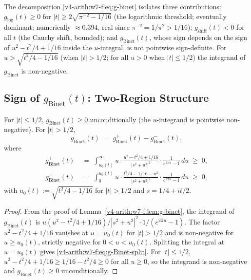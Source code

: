 \begin{remark}
\label{v4-arith:w7-f:rem:binet-content}
The decomposition \eqref{v4-arith:w7-f:eq:g-binet} isolates three
contributions: \(g_{\mathrm{log}}(t)\geq 0\) for
\(|t|\geq 2\sqrt{\pi^{-2}-1/16}\)
(the logarithmic threshold; eventually dominant; numerically
\(\approx 0.394\), real since \(\pi^{-2}=1/\pi^{2}>1/16\));
\(g_{\mathrm{shift}}(t)<0\) for all \(t\) (the Cauchy shift, bounded);
and \(g_{\mathrm{Binet}}(t)\), whose sign depends on the sign of
\(u^{2}-t^{2}/4+1/16\) inside the \(u\)-integral, is not pointwise
sign-definite. For \(u>\sqrt{t^{2}/4-1/16}\) (when \(|t|>1/2\); for all
\(u>0\) when \(|t|\leq 1/2\)) the integrand of \(g_{\mathrm{Binet}}\) is
non-negative.
\end{remark}

\subsection{Sign of \(g_{\mathrm{Binet}}(t)\): Two-Region Structure}
\label{v4-arith:w7-f:binet-decomposition:sign}

\begin{lemma}
\label{v4-arith:w7-f:lem:g-binet-signs}
For \(|t|\leq 1/2\), \(g_{\mathrm{Binet}}(t)\geq 0\)
unconditionally (the \(u\)-integrand is pointwise non-negative). For
\(|t|>1/2\),
\begin{equation}
\label{v4-arith:w7-f:eq:g-Binet-split}
g_{\mathrm{Binet}}(t)\;=\;g^{+}_{\mathrm{Binet}}(t)-g^{-}_{\mathrm{Binet}}(t),
\end{equation}
where
\begin{align*}
g^{+}_{\mathrm{Binet}}(t)&\;=\;\int_{u_{0}(t)}^{\infty}\!\!u\cdot\frac{u^{2}-t^{2}/4+1/16}{|s^{2}+u^{2}|^{2}}\cdot\frac{1}{e^{2\pi u}-1}\,du\;\geq\;0,\\
g^{-}_{\mathrm{Binet}}(t)&\;=\;\int_{0}^{u_{0}(t)}\!\!u\cdot\frac{t^{2}/4-1/16-u^{2}}{|s^{2}+u^{2}|^{2}}\cdot\frac{1}{e^{2\pi u}-1}\,du\;\geq\;0,
\end{align*}
with \(u_{0}(t):=\sqrt{t^{2}/4-1/16}\) for \(|t|>1/2\) and
\(s=1/4+it/2\).
\end{lemma}

\begin{proof}
From the proof of Lemma~\ref{v4-arith:w7-f:lem:g-binet}, the integrand of
\(g_{\mathrm{Binet}}(t)\) is
\(u(u^{2}-t^{2}/4+1/16)/|s^{2}+u^{2}|^{2}\cdot 1/(e^{2\pi u}-1)\). The
factor \(u^{2}-t^{2}/4+1/16\) vanishes at \(u=u_{0}(t)\) for \(|t|>1/2\)
and is non-negative for \(u\geq u_{0}(t)\), strictly negative for
\(0<u<u_{0}(t)\). Splitting the integral at \(u=u_{0}(t)\) gives
\eqref{v4-arith:w7-f:eq:g-Binet-split}. For \(|t|\leq 1/2\),
\(u^{2}-t^{2}/4+1/16\geq 1/16-t^{2}/4\geq 0\) for all \(u\geq 0\), so
the integrand is non-negative and \(g_{\mathrm{Binet}}(t)\geq 0\)
unconditionally.
\end{proof}

